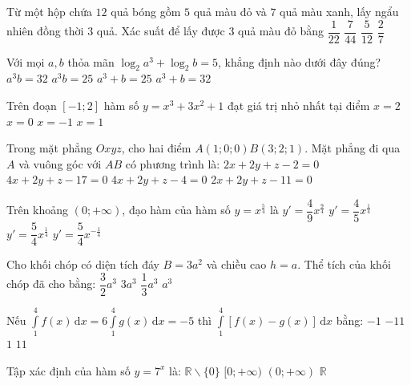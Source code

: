 \begin{ex}%
Từ một hộp chứa $12$ quả bóng gồm $5$ quả màu đỏ và $7$ quả màu xanh, lấy ngẩu nhiên đồng thời $3$ quả. Xác suất để lấy được $3$ quả màu đỏ bằng
\choice
{\True $\dfrac{1}{22}$}
{$\dfrac{7}{44}$}
{$\dfrac{5}{12}$}
{$\dfrac{2}{7}$}

\end{ex}
\begin{ex}%
Với mọi $a, b$ thỏa mãn $\log_2 a^3+\log_2 b=5$, khẳng định nào dưới đây đúng?
\choice
{\True $a^3 b=32$}
{$a^3 b=25$}
{$a^3+b=25$}
{$a^3+b=32$}

\end{ex}
\begin{ex}%
Trên đoạn $[-1; 2]$ hàm số $y=x^3+3 x^2+1$ đạt giá trị nhỏ nhất tại điểm
\choice
{$x=2$}
{\True $x=0$}
{$x=-1$}
{$x=1$}

\end{ex}
\begin{ex}%
Trong mặt phẳng $O x y z$, cho hai điểm $A(1; 0; 0) B(3; 2; 1)$. Mặt phẳng đi qua $A$ và vuông góc với $AB$ có phương trình là:
\choice
{\True $2 x+2 y+z-2=0$}
{$4 x+2 y+z-17=0$}
{$4 x+2 y+z-4=0$}
{$2 x+2 y+z-11=0$}

\end{ex}
\begin{ex}%
Trên khoảng $(0;+\infty)$, đạo hàm của hàm số $y=x^{\frac{5}{4}}$ là
\choice
{$y'=\dfrac{4}{9} x^{\frac{9}{4}}$}
{$y'=\dfrac{4}{5} x^{\frac{1}{4}}$}
{\True $y'=\dfrac{5}{4} x^{\frac{1}{4}}$}
{$y'=\dfrac{5}{4} x^{-\frac{1}{4}}$}

\end{ex}
\begin{ex}%
Cho khối chóp có diện tích đáy $B=3 a^2$ và chiều cao $h=a$. Thể tích của khối chóp đã cho bằng:
\choice
{$\dfrac{3}{2} a^3$}
{$3 a^3$}
{$\dfrac{1}{3} a^3$}
{\True $a^3$}

\end{ex}
\begin{ex}%
Nếu $\displaystyle\int\limits_1^4 f(x)\mathrm{\,d}x=6\displaystyle\int\limits_1^4 g(x)\mathrm{\,d}x=-5$ thì $\displaystyle\int\limits_1^4[f(x)-g(x)]\mathrm{\,d}x$ bằng:
\choice
{$-1$}
{$-11$}
{$1$}
{\True $11$}

\end{ex}
\begin{ex}%
Tập xác định của hàm số $y=7^{x}$ là:
\choice
{$\mathbb{R} \backslash\{0\}$}
{$[0;+\infty)$}
{$(0;+\infty)$}
{\True $\mathbb{R}$}

\end{ex}
